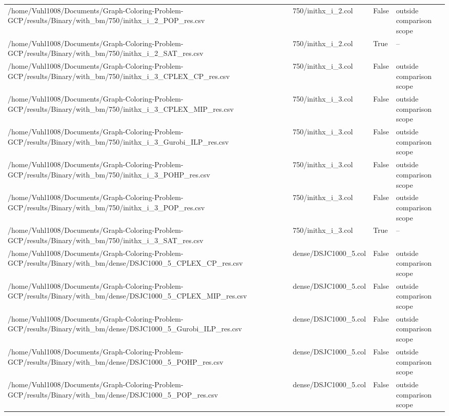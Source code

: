 \begin{table}[htbp]
\begin{tabular}{llll}
/home/Vuhl1008/Documents/Graph-Coloring-Problem-GCP/results/Binary/with\_bm/750/inithx\_i\_2\_POP\_res.csv & 750/inithx\_i\_2.col & False & outside comparison scope \\
/home/Vuhl1008/Documents/Graph-Coloring-Problem-GCP/results/Binary/with\_bm/750/inithx\_i\_2\_SAT\_res.csv & 750/inithx\_i\_2.col & True & -- \\
/home/Vuhl1008/Documents/Graph-Coloring-Problem-GCP/results/Binary/with\_bm/750/inithx\_i\_3\_CPLEX\_CP\_res.csv & 750/inithx\_i\_3.col & False & outside comparison scope \\
/home/Vuhl1008/Documents/Graph-Coloring-Problem-GCP/results/Binary/with\_bm/750/inithx\_i\_3\_CPLEX\_MIP\_res.csv & 750/inithx\_i\_3.col & False & outside comparison scope \\
/home/Vuhl1008/Documents/Graph-Coloring-Problem-GCP/results/Binary/with\_bm/750/inithx\_i\_3\_Gurobi\_ILP\_res.csv & 750/inithx\_i\_3.col & False & outside comparison scope \\
/home/Vuhl1008/Documents/Graph-Coloring-Problem-GCP/results/Binary/with\_bm/750/inithx\_i\_3\_POHP\_res.csv & 750/inithx\_i\_3.col & False & outside comparison scope \\
/home/Vuhl1008/Documents/Graph-Coloring-Problem-GCP/results/Binary/with\_bm/750/inithx\_i\_3\_POP\_res.csv & 750/inithx\_i\_3.col & False & outside comparison scope \\
/home/Vuhl1008/Documents/Graph-Coloring-Problem-GCP/results/Binary/with\_bm/750/inithx\_i\_3\_SAT\_res.csv & 750/inithx\_i\_3.col & True & -- \\
/home/Vuhl1008/Documents/Graph-Coloring-Problem-GCP/results/Binary/with\_bm/dense/DSJC1000\_5\_CPLEX\_CP\_res.csv & dense/DSJC1000\_5.col & False & outside comparison scope \\
/home/Vuhl1008/Documents/Graph-Coloring-Problem-GCP/results/Binary/with\_bm/dense/DSJC1000\_5\_CPLEX\_MIP\_res.csv & dense/DSJC1000\_5.col & False & outside comparison scope \\
/home/Vuhl1008/Documents/Graph-Coloring-Problem-GCP/results/Binary/with\_bm/dense/DSJC1000\_5\_Gurobi\_ILP\_res.csv & dense/DSJC1000\_5.col & False & outside comparison scope \\
/home/Vuhl1008/Documents/Graph-Coloring-Problem-GCP/results/Binary/with\_bm/dense/DSJC1000\_5\_POHP\_res.csv & dense/DSJC1000\_5.col & False & outside comparison scope \\
/home/Vuhl1008/Documents/Graph-Coloring-Problem-GCP/results/Binary/with\_bm/dense/DSJC1000\_5\_POP\_res.csv & dense/DSJC1000\_5.col & False & outside comparison scope \\

\end{tabular}
\end{table}
